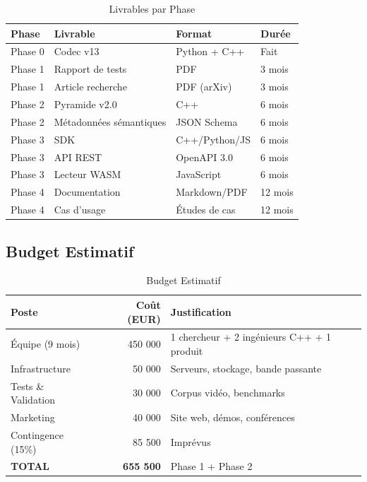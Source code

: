 \documentclass[12pt,a4paper]{article}
\begin{document}
	\begin{table}[h]
		\centering
		\caption{Livrables par Phase}
		\label{tab:livrables}
		\begin{tabular}{@{}llll@{}}
			\toprule
			\textbf{Phase} & \textbf{Livrable} & \textbf{Format} & \textbf{Durée} \\
			\midrule
			Phase 0 & Codec v13 & Python + C++ & Fait \\
			Phase 1 & Rapport de tests & PDF & 3 mois \\
			Phase 1 & Article recherche & PDF (arXiv) & 3 mois \\
			Phase 2 & Pyramide v2.0 & C++ & 6 mois \\
			Phase 2 & Métadonnées sémantiques & JSON Schema & 6 mois \\
			Phase 3 & SDK & C++/Python/JS & 6 mois \\
			Phase 3 & API REST & OpenAPI 3.0 & 6 mois \\
			Phase 3 & Lecteur WASM & JavaScript & 6 mois \\
			Phase 4 & Documentation & Markdown/PDF & 12 mois \\
			Phase 4 & Cas d'usage & Études de cas & 12 mois \\
			\bottomrule
		\end{tabular}
	\end{table}
	
	\subsection{Budget Estimatif}
	\label{subsec:budget}
	
	\begin{table}[h]
		\centering
		\caption{Budget Estimatif}
		\label{tab:budget}
		\begin{tabular}{@{}lrp{8cm}@{}}
			\toprule
			\textbf{Poste} & \textbf{Coût (EUR)} & \textbf{Justification} \\
			\midrule
			Équipe (9 mois) & 450 000 & 1 chercheur + 2 ingénieurs C++ + 1 produit \\
			Infrastructure & 50 000 & Serveurs, stockage, bande passante \\
			Tests \& Validation & 30 000 & Corpus vidéo, benchmarks \\
			Marketing & 40 000 & Site web, démos, conférences \\
			Contingence (15\%) & 85 500 & Imprévus \\
			\midrule
			\textbf{TOTAL} & \textbf{655 500} & Phase 1 + Phase 2 \\
			\bottomrule
		\end{tabular}
	\end{table}
	
\end{document}
